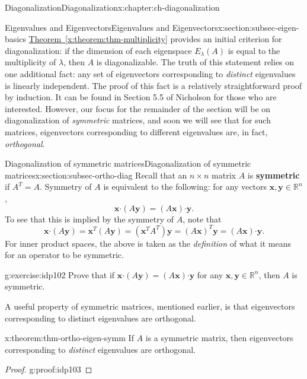 \documentclass[oneside,10pt,]{book}
\newcommand{\xreffont}{\relax}
\newcommand{\terminology}[1]{\textbf{#1}}
\numberwithin{equation}{section}
\newcommand{\R}{\mathbb{R}}
\newcommand{\dotp}{\!\boldsymbol{\cdot}\!}
\newcommand{\xx}{\mathbf{x}}
\newcommand{\yy}{\mathbf{y}}
\begin{document}
\begin{chapterptx}{Diagonalization}{}{Diagonalization}{}{}{x:chapter:ch-diagonalization}
\begin{sectionptx}{Eigenvalues and Eigenvectors}{}{Eigenvalues and Eigenvectors}{}{}{x:section:subsec-eigen-basics}
\hyperref[x:theorem:thm-multiplicity]{Theorem~{\xreffont\ref{x:theorem:thm-multiplicity}}} provides an initial criterion for diagonalization: if the dimension of each eigenspace \(E_\lambda(A)\) is equal to the multiplicity of \(\lambda\), then \(A\) is diagonalizable. The truth of this statement relies on one additional fact: any set of eigenvectors corresponding to \emph{distinct} eigenvalues is linearly independent. The proof of this fact is a relatively straightforward proof by induction. It can be found in Section 5.5 of Nicholson for those who are interested. However, our focus for the remainder of the section will be on diagonalization of \emph{symmetric} matrices, and soon we will see that for such matrices, eigenvectors corresponding to different eigenvalues are, in fact, \emph{orthogonal}.%
\end{sectionptx}
%
%
\typeout{************************************************}
\typeout{************************************************}
%
\begin{sectionptx}{Diagonalization of symmetric matrices}{}{Diagonalization of symmetric matrices}{}{}{x:section:subsec-ortho-diag}
Recall that an \(n\times n\) matrix \(A\) is \terminology{symmetric} if \(A^T=A\). Symmetry of \(A\) is equivalent to the following: for any vectors \(\xx,\yy\in\R^n\),%
\begin{equation*}
\xx\dotp (A\yy) = (A\xx)\dotp \yy\text{.}
\end{equation*}
To see that this is implied by the symmetry of \(A\), note that%
\begin{equation*}
\xx\dotp (A\yy) = \xx^T(A\yy)=(\xx^TA^T)\yy = (A\xx)^T\yy=(A\xx)\dotp\yy\text{.}
\end{equation*}
For inner product spaces, the above is taken as the \emph{definition} of what it means for an operator to be symmetric.%
\begin{inlineexercise}{}{g:exercise:idp102}%
Prove that if \(\xx\dotp(A\yy)=(A\xx)\dotp \yy\) for any \(\xx,\yy\in\R^n\), then \(A\) is symmetric.%
\end{inlineexercise}%
A useful property of symmetric matrices, mentioned earlier, is that eigenvectors corresponding to distinct eigenvalues are orthogonal.%
\begin{theorem}{}{}{x:theorem:thm-ortho-eigen-symm}%
If \(A\) is a symmetric matrix, then eigenvectors corresponding to \emph{distinct} eigenvalues are orthogonal.%
\end{theorem}
\begin{proof}{}{g:proof:idp103}

\end{proof}
\end{sectionptx}
\end{chapterptx}
\end{document}
